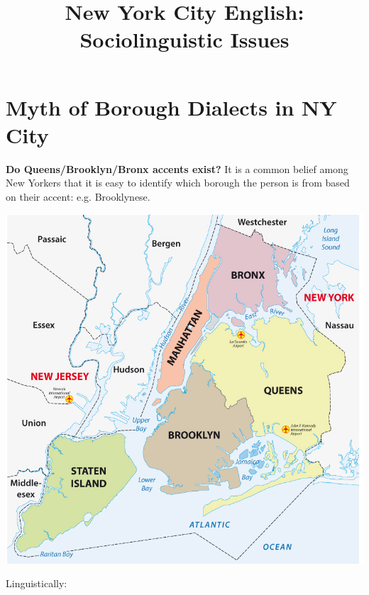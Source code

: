 \documentclass[11pt]{article}
\title{New York City English: Sociolinguistic Issues}%
\renewcommand{\baselinestretch}{1.0}
\newcommand{\1}{$'$}
\newcommand{\2}{$''$}
\newcommand{\3}{$'''$}
\begin{document}


\begin{center}
\LARGE\textbf{\thetitle}
\end{center}


\tableofcontents

\section{Myth of Borough Dialects in NY City}

\textbf{Do Queens/Brooklyn/Bronx accents exist?} It is a common belief among New Yorkers that it is easy to identify which borough the person is from based on their accent: e.g. Brooklynese.

\begin{center}
\includegraphics[width=.5\textwidth]{NYC_boroughs}
\end{center}


Linguistically:
\end{document}
